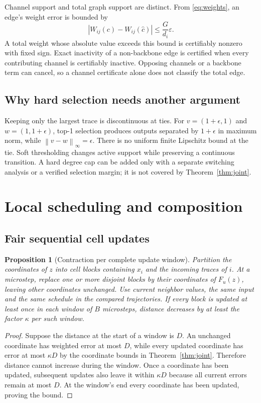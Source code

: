 \documentclass[11pt,a4paper]{article}
\newtheorem{proposition}[theorem]{Proposition}
\theoremstyle{definition}\newtheorem{definition}[theorem]{Definition}
\newcommand{\norm}[1]{\left\lVert#1\right\rVert}
\begin{document}
Channel support and total graph support are distinct. From \eqref{eq:weights}, an edge's weight error is bounded by
\begin{equation}
 |W_{ij}(c)-W_{ij}(\widehat c)|\leq\frac{G}{d_i}\varepsilon. \label{eq:edgeerror}
\end{equation}
A total weight whose absolute value exceeds this bound is certifiably nonzero with fixed sign. Exact inactivity of a non-backbone edge is certified when every contributing channel is certifiably inactive. Opposing channels or a backbone term can cancel, so a channel certificate alone does not classify the total edge.

\subsection{Why hard selection needs another argument}
Keeping only the largest trace is discontinuous at ties. For $v=(1+\epsilon,1)$ and $w=(1,1+\epsilon)$, top-1 selection produces outputs separated by $1+\epsilon$ in maximum norm, while $\norm{v-w}_\infty=\epsilon$. There is no uniform finite Lipschitz bound at the tie. Soft thresholding changes active support while preserving a continuous transition. A hard degree cap can be added only with a separate switching analysis or a verified selection margin; it is not covered by Theorem~\ref{thm:joint}.

\section{Local scheduling and composition}
\subsection{Fair sequential cell updates}
\begin{proposition}[Contraction per complete update window]\label{prop:async}
Partition the coordinates of $z$ into cell blocks containing $x_i$ and the incoming traces of $i$. At a microstep, replace one or more disjoint blocks by their coordinates of $F_u(z)$, leaving other coordinates unchanged. Use current neighbor values, the same input and the same schedule in the compared trajectories. If every block is updated at least once in each window of $B$ microsteps, distance decreases by at least the factor $\kappa$ per such window.
\end{proposition}
\begin{proof}
Suppose the distance at the start of a window is $D$. An unchanged coordinate has weighted error at most $D$, while every updated coordinate has error at most $\kappa D$ by the coordinate bounds in Theorem~\ref{thm:joint}. Therefore distance cannot increase during the window. Once a coordinate has been updated, subsequent updates also leave it within $\kappa D$ because all current errors remain at most $D$. At the window's end every coordinate has been updated, proving the bound.
\end{proof}
\end{document}
